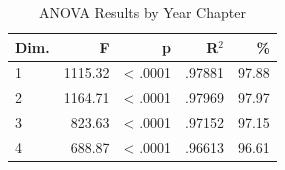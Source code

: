\begin{table}[H]
  \centering
  \caption{ANOVA Results by Year Chapter}
  \label{tab:anova_year_chapter}
  \begin{tabular}{l r r r r}
    Dim. & F & p & R$^2$ & \% \\
    \hline
    1 & 1115.32 & < .0001 & .97881 & 97.88 \\
    2 & 1164.71 & < .0001 & .97969 & 97.97 \\
    3 & 823.63 & < .0001 & .97152 & 97.15 \\
    4 & 688.87 & < .0001 & .96613 & 96.61 \\
  \end{tabular}
\end{table}
